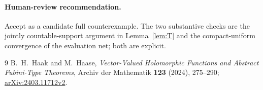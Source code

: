 \documentclass[10pt]{article}
\begin{document}
\paragraph{Human-review recommendation.}
Accept as a candidate full counterexample.  The two substantive checks are
the jointly countable-support argument in Lemma~\ref{lem:T} and the
compact-uniform convergence of the evaluation net; both are explicit.

\begin{thebibliography}{9}
B.~H.~Haak and M.~Haase,
\emph{Vector-Valued Holomorphic Functions and Abstract Fubini-Type Theorems},
Archiv der Mathematik \textbf{123} (2024), 275--290;
\href{https://arxiv.org/abs/2403.11712}{arXiv:2403.11712v2}.
\end{thebibliography}
\end{document}
